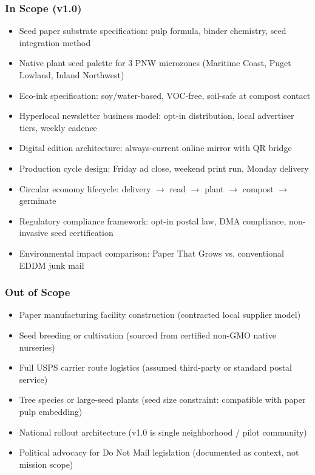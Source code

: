 \documentclass[11pt,letterpaper]{article}
\begin{document}
\subsubsection{In Scope (v1.0)}
\begin{itemize}[leftmargin=1.5em]
  \item Seed paper substrate specification: pulp formula, binder chemistry, seed integration method
  \item Native plant seed palette for 3 PNW microzones (Maritime Coast, Puget Lowland, Inland Northwest)
  \item Eco-ink specification: soy/water-based, VOC-free, soil-safe at compost contact
  \item Hyperlocal newsletter business model: opt-in distribution, local advertiser tiers, weekly cadence
  \item Digital edition architecture: always-current online mirror with QR bridge
  \item Production cycle design: Friday ad close, weekend print run, Monday delivery
  \item Circular economy lifecycle: delivery $\rightarrow$ read $\rightarrow$ plant $\rightarrow$ compost $\rightarrow$ germinate
  \item Regulatory compliance framework: opt-in postal law, DMA compliance, non-invasive seed certification
  \item Environmental impact comparison: Paper That Grows vs. conventional EDDM junk mail
\end{itemize}

\subsubsection{Out of Scope}
\begin{itemize}[leftmargin=1.5em]
  \item Paper manufacturing facility construction (contracted local supplier model)
  \item Seed breeding or cultivation (sourced from certified non-GMO native nurseries)
  \item Full USPS carrier route logistics (assumed third-party or standard postal service)
  \item Tree species or large-seed plants (seed size constraint: compatible with paper pulp embedding)
  \item National rollout architecture (v1.0 is single neighborhood / pilot community)
  \item Political advocacy for Do Not Mail legislation (documented as context, not mission scope)
\end{itemize}
\end{document}
